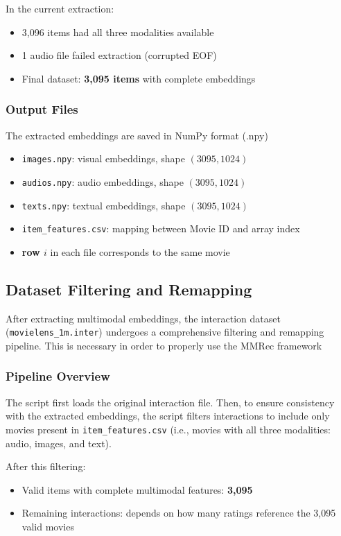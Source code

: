 In the current extraction:
\begin{itemize}
    \item 3,096 items had all three modalities available
    \item 1 audio file failed extraction (corrupted EOF)
    \item Final dataset: \textbf{3,095 items} with complete embeddings
\end{itemize}

\subsubsection{Output Files}

The extracted embeddings are saved in NumPy format (.npy)

\begin{itemize}
    \item \texttt{images.npy}: visual embeddings, shape $(3095, 1024)$
    \item \texttt{audios.npy}: audio embeddings, shape $(3095, 1024)$
    \item \texttt{texts.npy}: textual embeddings, shape $(3095, 1024)$
    \item \texttt{item\_features.csv}: mapping between Movie ID and array index
    \item \textbf{row $i$} in each file corresponds to the same movie
\end{itemize}


\subsection{Dataset Filtering and Remapping}

After extracting multimodal embeddings, the interaction dataset (\texttt{movielens\_1m.inter}) undergoes a comprehensive filtering and remapping pipeline. This is necessary in order to properly use the MMRec framework

\subsubsection{Pipeline Overview}
The script first loads the original interaction file. Then, to ensure consistency with the extracted embeddings, the script filters interactions to include only movies present in \texttt{item\_features.csv} (i.e., movies with all three modalities: audio, images, and text).

After this filtering:
\begin{itemize}
    \item Valid items with complete multimodal features: \textbf{3,095}
    \item Remaining interactions: depends on how many ratings reference the 3,095 valid movies
\end{itemize}

